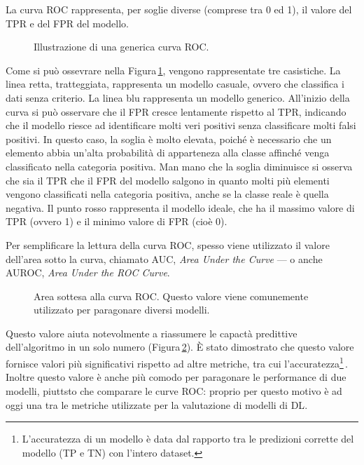 La curva \acs{ROC} rappresenta, per soglie diverse (comprese tra 0 ed 1), il valore del \acs{TPR} e del \acs{FPR} del modello.
%
\begin{figure}[!t]
    \centering
     
    \caption[Illustrazione di una generica curva ROC.]{Illustrazione di una generica curva ROC.}\label{fig:ROC-curve} 
\end{figure}
% 
Come si può ossevrare nella Figura\,\ref{fig:ROC-curve}, vengono rappresentate tre casistiche. La linea retta, tratteggiata, rappresenta un modello casuale, ovvero che classifica i dati senza criterio. La linea blu rappresenta un modello generico. All'inizio della curva si può osservare che il \acs{FPR} cresce lentamente rispetto al \acs{TPR}, indicando che il modello riesce ad identificare molti veri positivi senza classificare molti falsi positivi. In questo caso, la soglia è molto elevata, poiché è necessario che un elemento abbia un'alta probabilità di apparteneza alla classe affinché venga classificato nella categoria positiva. Man mano che la soglia diminuisce si osserva che sia il \acs{TPR} che il \acs{FPR} del modello salgono in quanto molti più elementi vengono classificati nella categoria positiva, anche se la classe reale è quella negativa. Il punto rosso rappresenta il modello ideale, che ha il massimo valore di \acs{TPR} (ovvero 1) e il minimo valore di \acs{FPR} (cioè 0).

Per semplificare la lettura della curva \acs{ROC}, spesso viene utilizzato il valore dell'area sotto la curva, chiamato \acs{AUC}, \textit{Area Under the Curve} — o anche \acs{AUROC}, \textit{Area Under the \acs{ROC} Curve}.
% 
\begin{figure}[!b]
    \centering
     
    \caption[Area sottesa alla curva \acs{ROC}.]{Area sottesa alla curva \acs{ROC}. Questo valore viene comunemente utilizzato per paragonare diversi modelli.}\label{fig:AUC-value} 
\end{figure}
% 
Questo valore aiuta notevolmente a riassumere le capactà predittive dell'algoritmo in un solo numero (Figura\,\ref{fig:AUC-value}). È stato dimostrato che questo valore fornisce valori più significativi rispetto ad altre metriche, tra cui l'accuratezza\footnote{L'accuratezza di un modello è data dal rapporto tra le predizioni corrette del modello (TP e TN) con l'intero dataset.}\,\cite{huang2005using}. Inoltre questo valore è anche più comodo per paragonare le performance di due modelli, piuttsto che comparare le curve \acs{ROC}: proprio per questo motivo è ad oggi una tra le metriche utilizzate per la valutazione di modelli di \acs{DL}.



